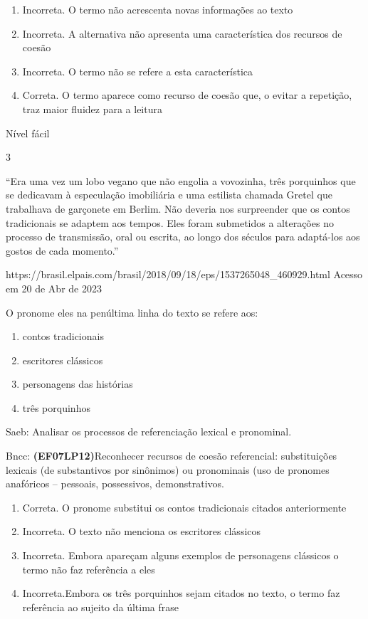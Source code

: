 {{\begin{enumerate}
\def\labelenumi{\arabic{enumi}.}
\item
  Incorreta. O termo não acrescenta novas informações ao texto
\item
  Incorreta. A alternativa não apresenta uma característica dos recursos
  de coesão
\item
  Incorreta. O termo não se refere a esta característica
\item
  Correta. O termo aparece como recurso de coesão que, o evitar a
  repetição, traz maior fluidez para a leitura
\end{enumerate}

Nível fácil

\num{3}

``Era uma vez um lobo vegano que não engolia a vovozinha, três
porquinhos que se dedicavam à especulação imobiliária e uma estilista
chamada Gretel que trabalhava de garçonete em Berlim. Não deveria nos
surpreender que os contos tradicionais se adaptem aos tempos. Eles foram
submetidos a alterações no processo de transmissão, oral ou escrita, ao
longo dos séculos para adaptá-los aos gostos de cada momento.''

https://brasil.elpais.com/brasil/2018/09/18/eps/1537265048\_460929.html
Acesso em 20 de Abr de 2023

O pronome eles na penúltima linha do texto se refere aos:

\begin{enumerate}
\def\labelenumi{\alph{enumi})}
\item
  contos tradicionais
\item
  escritores clássicos
\item
  personagens das histórias
\item
  três porquinhos
\end{enumerate}

Saeb: Analisar os processos de referenciação lexical e pronominal.

Bncc: \textbf{(EF07LP12)}Reconhecer recursos de coesão referencial:
substituições lexicais (de substantivos por sinônimos) ou pronominais
(uso de pronomes anafóricos -- pessoais, possessivos, demonstrativos.

\begin{enumerate}
\def\labelenumi{\arabic{enumi}.}
\item
  Correta. O pronome substitui os contos tradicionais citados
  anteriormente
\item
  Incorreta. O texto não menciona os escritores clássicos
\item
  Incorreta. Embora apareçam alguns exemplos de personagens clássicos o
  termo não faz referência a eles
\item
  Incorreta.Embora os três porquinhos sejam citados no texto, o termo
  faz referência ao sujeito da última frase
\end{enumerate}

}}
